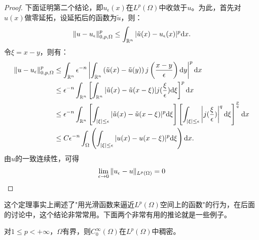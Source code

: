 \begin{proof}
    下面证明第二个结论，即$u_{\epsilon}(x)$在$L^{p}(\Omega)$中收敛于$u$。为此，首先对$u(x)$做零延拓，设延拓后的函数为$\tilde{u}$，则：
    \begin{equation}
        \|u-u_{\epsilon}\|_{0,p,\Omega}^{p}\le\int_{\mathbb{R}^{n}}|\tilde{u}(x)-u_{\epsilon}(x)|^{p}\mathrm{d} x.
    \end{equation}
    令$\xi=x-y$，则有：
    \begin{equation}
        \begin{aligned}
            \|u-u_{\epsilon}\|_{0,p,\Omega}^{p}&\le\int_{\mathbb{R}^{n}}\epsilon^{-n}\left|\int_{\mathbb{R}^{n}}\left(\tilde{u}(x)-\tilde{u}(y)\right)j\left(\frac{x-y}{\epsilon}\right)\mathrm{d} y\right|^{p}\mathrm{d} x\\
            &\le\epsilon^{-n}\int_{\mathbb{R}^{n}}\left[\int_{\mathbb{R}^{n}}|\tilde{u}(x)-\tilde{u}(x-\xi)|j(\frac{\xi}{\epsilon})\mathrm{d}\xi\right]^{p}\mathrm{d} x\\
            &\le\epsilon^{-n}\int_{\mathbb{R}^{n}}\left[\int_{|\xi|\le\epsilon}|\tilde{u}(x)-\tilde{u}(x-\xi)|^{p}\mathrm{d} \xi\right]\left[\int_{|\xi|\le\epsilon}\left|j(\frac{\xi}{\epsilon})\right|^{q}\mathrm{d}\xi\right]^{\frac{p}{q}}\mathrm{d} x\\
            &\le C\epsilon^{-n}\int_{\Omega}\left(\int_{|\xi|\le\epsilon}|u(x)-u(x-\xi)|^{p}\mathrm{d}\xi\right)\mathrm{d} x.
        \end{aligned}
    \end{equation}
    由$u$的一致连续性，可得
    \begin{equation}
        \lim_{\epsilon\rightarrow 0}\|u_{\epsilon}-u\|_{L^{p}(\Omega)}=0
    \end{equation}
\end{proof}
\begin{remark}
    这个定理事实上阐述了"用光滑函数来逼近$L^{p}(\Omega)$空间上的函数"的行为，在后面的讨论中，这个结论非常常用。下面两个非常有用的推论就是一些例子。
\end{remark}
\begin{corollary}
    对$1\le p<+\infty$，$\Omega$有界，则$C_{0}^{\infty}(\Omega)$在$L^{p}(\Omega)$中稠密。
\end{corollary}
